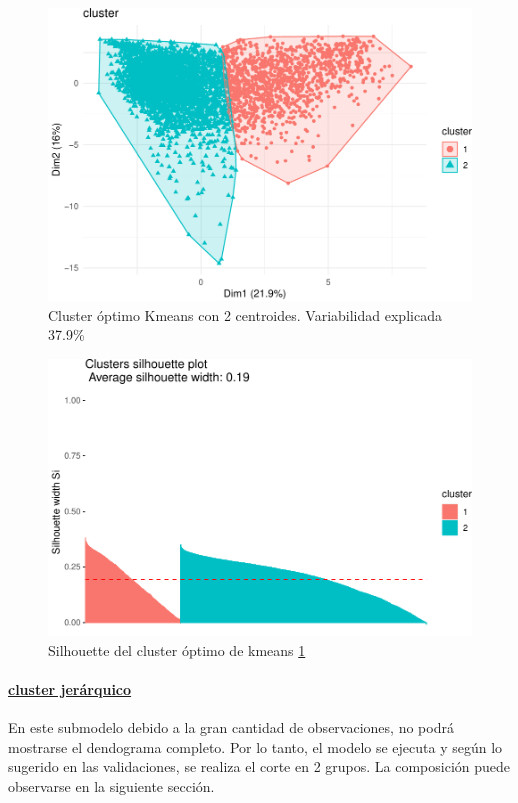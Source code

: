 \begin{figure}[!htb]
	\centering
	\includegraphics{imagenes/modelo_clusters/unnamed-chunk-18-1.pdf}
	\caption{Cluster óptimo Kmeans con 2 centroides. Variabilidad explicada 37.9\%}
	\label{fig:kmeans_cluster_optimo}
\end{figure}

\begin{figure}[!htb]
	\centering
	\includegraphics{imagenes/modelo_clusters/unnamed-chunk-18-2.pdf}
	\caption{Silhouette del cluster óptimo de kmeans \ref{fig:kmeans_cluster_optimo}}
	\label{fig:kmeans_cluster_optimo_silhouette}
\end{figure}


\clearpage


\hypertarget{cluster-jeruxe1rquico}{%
	\paragraph{\textbf{\underline{cluster jerárquico}}}\label{cluster-jeruxe1rquico}}
En este submodelo debido a la gran cantidad de observaciones, no podrá mostrarse el dendograma completo. Por lo tanto, el modelo se ejecuta y según lo sugerido en
las validaciones, se realiza el corte en 2 grupos. La composición puede observarse en la siguiente sección.


